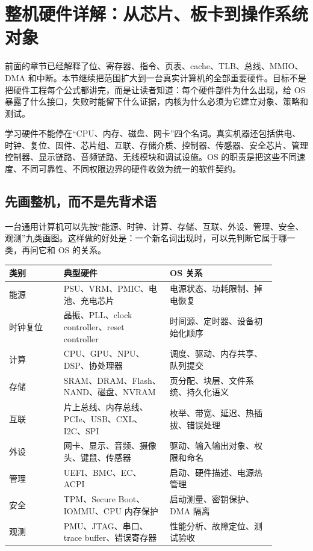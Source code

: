 \section{整机硬件详解：从芯片、板卡到操作系统对象}

前面的章节已经解释了位、寄存器、指令、页表、cache、TLB、总线、MMIO、DMA 和中断。本节继续把范围扩大到一台真实计算机的全部重要硬件。目标不是把硬件工程每个公式都讲完，而是让读者知道：每个硬件部件为什么出现，给 OS 暴露了什么接口，失败时能留下什么证据，内核为什么必须为它建立对象、策略和测试。

\begin{keyidea}
学习硬件不能停在“CPU、内存、磁盘、网卡”四个名词。真实机器还包括供电、时钟、复位、固件、芯片组、互联、存储介质、控制器、传感器、安全芯片、管理控制器、显示链路、音频链路、无线模块和调试设施。OS 的职责是把这些不同速度、不同可靠性、不同权限边界的硬件收敛为统一的软件契约。
\end{keyidea}

\subsection{先画整机，而不是先背术语}

一台通用计算机可以先按“能源、时钟、计算、存储、互联、外设、管理、安全、观测”九类画图。这样做的好处是：一个新名词出现时，可以先判断它属于哪一类，再问它和 OS 的关系。

\begin{longtable}{p{0.18\linewidth}p{0.35\linewidth}p{0.35\linewidth}}
\toprule
类别 & 典型硬件 & OS 关系 \\
\midrule
能源 & PSU、VRM、PMIC、电池、充电芯片 & 电源状态、功耗限制、掉电恢复 \\
时钟复位 & 晶振、PLL、clock controller、reset controller & 时间源、定时器、设备初始化顺序 \\
计算 & CPU、GPU、NPU、DSP、协处理器 & 调度、驱动、内存共享、队列提交 \\
存储 & SRAM、DRAM、Flash、NAND、磁盘、NVRAM & 页分配、块层、文件系统、持久化语义 \\
互联 & 片上总线、内存总线、PCIe、USB、CXL、I2C、SPI & 枚举、带宽、延迟、热插拔、错误处理 \\
外设 & 网卡、显示、音频、摄像头、键鼠、传感器 & 驱动、输入输出对象、权限和命名 \\
管理 & UEFI、BMC、EC、ACPI & 启动、硬件描述、电源热管理 \\
安全 & TPM、Secure Boot、IOMMU、CPU 内存保护 & 启动测量、密钥保护、DMA 隔离 \\
观测 & PMU、JTAG、串口、trace buffer、错误寄存器 & 性能分析、故障定位、测试验收 \\
\bottomrule
\end{longtable}

